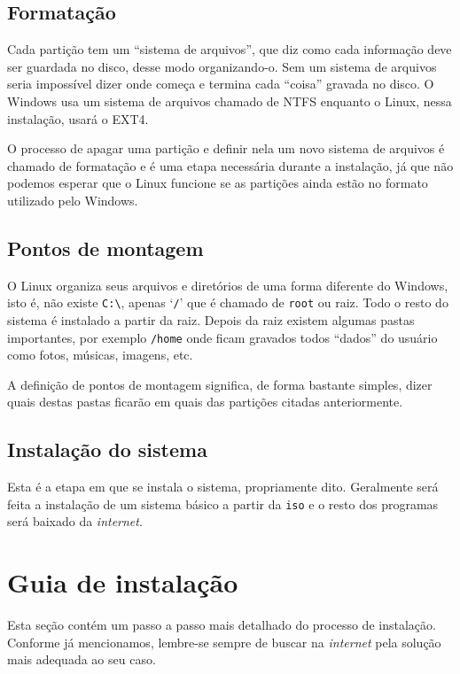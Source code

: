\documentclass{handout_utfpr}
\begin{document}

\subsection{Formatação}
Cada partição tem um ``sistema de arquivos'', que diz como cada informação deve ser guardada no disco, desse modo organizando-o. Sem um sistema de arquivos seria impossível dizer onde começa e termina cada ``coisa'' gravada no disco. O Windows usa um sistema de arquivos chamado de NTFS enquanto o Linux, nessa instalação, usará o EXT4.

O processo de apagar uma partição e definir nela um novo sistema de arquivos é chamado de formatação e é uma etapa necessária durante a instalação, já que não podemos esperar que o Linux funcione se as partições ainda estão no formato utilizado pelo Windows.

\subsection{Pontos de montagem}
O Linux organiza seus arquivos e diretórios de uma forma diferente do Windows, isto é, não existe \texttt{C:\textbackslash}, apenas `\texttt{/}' que é chamado de \texttt{root} ou raiz. Todo o resto do sistema é instalado a partir da raiz. Depois da raiz existem algumas pastas importantes, por exemplo \texttt{/home} onde ficam gravados todos ``dados'' do usuário como fotos, músicas, imagens, etc.

A definição de pontos de montagem significa, de forma bastante simples, dizer quais destas pastas ficarão em quais das partições citadas anteriormente.

\subsection{Instalação do sistema}
Esta é a etapa em que se instala o sistema, propriamente dito. Geralmente será feita a instalação de um sistema básico a partir da \texttt{iso} e o resto dos programas será baixado da \textit{internet}.

\section{Guia de instalação}\label{guia}
Esta seção contém um passo a passo mais detalhado do processo de instalação. Conforme já mencionamos, lembre-se sempre de buscar na \textit{internet} pela solução mais adequada ao seu caso.
\end{document}
